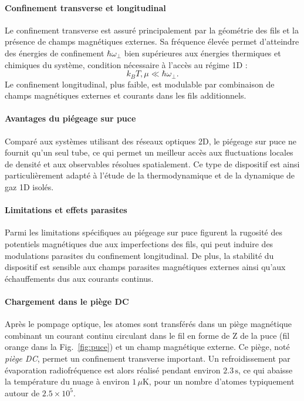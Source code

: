 \paragraph{Confinement transverse et longitudinal}
Le confinement transverse est assuré principalement par la géométrie des fils et la présence de champs magnétiques externes. Sa fréquence élevée permet d’atteindre des énergies de confinement \(\hbar \omega_\perp\) bien supérieures aux énergies thermiques et chimiques du système, condition nécessaire à l’accès au régime 1D :
\[
k_B T, \mu \ll \hbar \omega_\perp.
\]
Le confinement longitudinal, plus faible, est modulable par combinaison de champs magnétiques externes et courants dans les fils additionnels.

\paragraph{Avantages du piégeage sur puce}
Comparé aux systèmes utilisant des réseaux optiques 2D, le piégeage sur puce ne fournit qu’un seul tube, ce qui permet un meilleur accès aux fluctuations locales de densité et aux observables résolues spatialement. Ce type de dispositif est ainsi particulièrement adapté à l'étude de la thermodynamique et de la dynamique de gaz 1D isolés.

\paragraph{Limitations et effets parasites}
Parmi les limitations spécifiques au piégeage sur puce figurent la rugosité des potentiels magnétiques due aux imperfections des fils, qui peut induire des modulations parasites du confinement longitudinal. De plus, la stabilité du dispositif est sensible aux champs parasites magnétiques externes ainsi qu’aux échauffements dus aux courants continus.



\paragraph{Chargement dans le piège DC}
Après le pompage optique, les atomes sont transférés dans un piège magnétique combinant un courant continu circulant dans le fil en forme de Z de la puce (fil orange dans la Fig.~\ref{fig:puce}) et un champ magnétique externe. Ce piège, noté \emph{piège DC}, permet un confinement transverse important. Un refroidissement par évaporation radiofréquence est alors réalisé pendant environ \( 2.3\,\mathrm{s} \), ce qui abaisse la température du nuage à environ \( 1\,\mu\mathrm{K} \), pour un nombre d’atomes typiquement autour de \( 2.5 \times 10^5 \).

